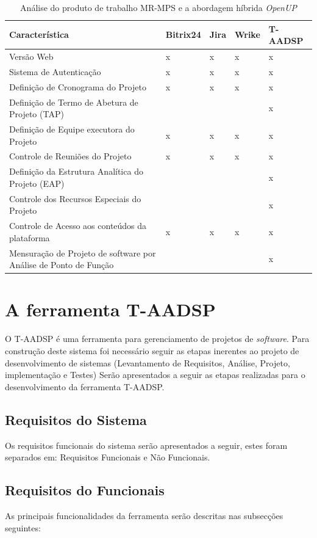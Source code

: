 \documentclass{acm_proc_article-sp}
\begin{document}
\begin{table}[h]
\scriptsize
\caption{Análise do produto de trabalho MR-MPS e a abordagem híbrida \textit{OpenUP}} 
\centering
\begin{tabular}{|p{70mm}|p{20mm}|p{20mm}|p{20mm}|p{20mm}|}
\hline
 Característica & Bitrix24 & Jira & Wrike & T-AADSP \\
\hline
Versão Web & x & x  & x  & x \\
Sistema de Autenticação & x & x  & x  & x \\
Definição de Cronograma do Projeto & x & x  & x  & x \\
Definição de Termo de Abetura de Projeto (TAP) &  &   &  & x \\
Definição de Equipe executora do Projeto & x & x  & x  & x \\
Controle de Reuniões do Projeto  & x & x  & x  & x \\
Definição da Estrutura Analítica do Projeto (EAP) &  &   &  & x \\
Controle dos Recursos Especiais do Projeto &  &   &  & x \\
Controle de Acesso aos conteúdos da plataforma& x & x  & x  & x \\
Mensuração de Projeto de software por Análise de Ponto de Função  &  &   &  & x \\
\hline
\end{tabular}
\end{table}

\section{A ferramenta T-AADSP}
O T-AADSP é uma ferramenta para gerenciamento de projetos de \textit{software}. Para construção deste sistema foi necessário seguir as etapas inerentes ao projeto de desenvolvimento de sistemas (Levantamento de Requisitos, Análise, Projeto, implementação e Testes)
Serão apresentados a seguir as etapas realizadas para o desenvolvimento da ferramenta T-AADSP.

\subsection{Requisitos do Sistema}
Os requisitos funcionais do sistema serão apresentados a seguir, estes foram separados em: Requisitos Funcionais e Não Funcionais.

\subsection{Requisitos do Funcionais}
As principais funcionalidades da ferramenta serão descritas
nas subsecções seguintes:
\end{document}
